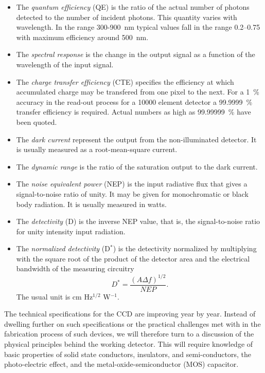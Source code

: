\begin{itemize}
  \item The {\em quantum efficiency} (QE) is the ratio of the actual
  number of photons detected to the number of incident photons. This
  quantity varies with wavelength. In the range 300-900~nm typical
  values fall in the range 0.2--0.75 with maximum efficiency around 
  500~nm.  
  \item The {\em spectral response} is the change in the output
  signal as a function of the wavelength of the input signal.
  \item The {\em charge transfer efficiency} (CTE) specifies the 
  efficiency at which accumulated charge may be transfered from one 
  pixel to the next. For a 1~\% accuracy in the read-out process 
  for a 10000 element detector a 99.9999~\% transfer efficiency is
  required. Actual numbers as high as 99.99999~\% have been quoted.
  \item The {\em dark current} represent the output from the
  non-illuminated detector. It is usually measured as a
  root-mean-square current.  
  \item The {\em dynamic range} is the ratio of the saturation output
  to the dark current.  
  \item The {\em  noise equivalent power} (NEP) is the input radiative 
  flux that gives
  a signal-to-noise ratio of unity. It may be given for monochromatic
  or black body radiation. It is usually measured in watts.  
  \item The  {\em detectivity} (D) is the inverse NEP value, that is, the
  signal-to-noise ratio for unity intensity input radiation.  
  \item  The {\em normalized detectivity} (D$^*$) is the detectivity
  normalized by multiplying with the square root of the product of the
  detector area and the electrical bandwidth of the measuring
  circuitry 
  \begin{equation} 
    D^* = \frac{(A \Delta f)^{1/2}}{NEP}.
    \label{CCD.Dstar}
  \end{equation}
  The usual unit is cm Hz$^{1/2}$ W$^{-1}$.
\end{itemize}

The technical specifications for the CCD are improving year by
year. Instead of dwelling further on such specifications or the
practical challenges met with in the fabrication process of such
devices, we will therefore turn to a discussion of the physical
principles behind the working detector. This will require knowledge of
basic properties of solid state conductors, insulators, and
semi-conductors, the photo-electric effect, and the
metal-oxide-semiconductor (MOS) capacitor.

